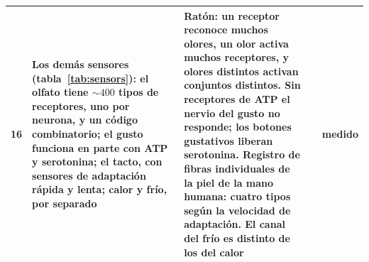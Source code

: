 {\begin{longtable}{>{\raggedright}p{0.5cm}>{\raggedright}p{4.0cm}>{\raggedright}p{5.6cm}>{\raggedright}p{2.3cm}>{\raggedright\arraybackslash}p{1.7cm}}
16 & Los demás sensores (tabla~\ref{tab:sensors}): el olfato tiene $\sim400$ tipos de receptores, uno por neurona, y un código combinatorio; el gusto funciona en parte con ATP y serotonina; el tacto, con sensores de adaptación rápida y lenta; calor y frío, por separado & Ratón: un receptor reconoce muchos olores, un olor activa muchos receptores, y olores distintos activan conjuntos distintos. Sin receptores de ATP el nervio del gusto no responde; los botones gustativos liberan serotonina. Registro de fibras individuales de la piel de la mano humana: cuatro tipos según la velocidad de adaptación. El canal del frío es distinto de los del calor & \cite{Mombaerts2004,Malnic1999,Finger2005,Huang2005,JohanssonVallbo1979,McKemy2002} & medido \\
\bottomrule
\end{longtable}}
